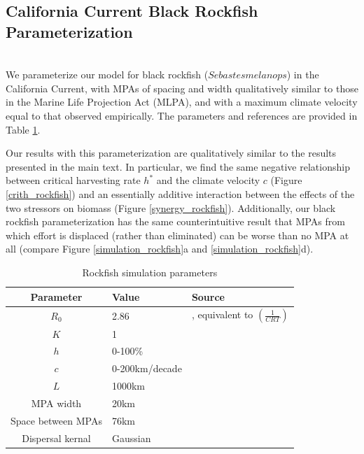 \documentclass[12pt,english]{article}
\begin{document}
\subsection{California Current Black Rockfish Parameterization \label{rock}}
~\\We parameterize our model for black rockfish ($Sebastes melanops$) in the California Current, with MPAs of spacing and width qualitatively similar to those in the Marine Life Projection Act (MLPA), and with a maximum climate velocity equal to that observed empirically. The parameters and references are provided in Table \ref{rockfish_params}.

Our results with this parameterization are qualitatively similar to the results presented in the main text. In particular, we find the same negative relationship between critical harvesting rate $h^*$ and the climate velocity $c$ (Figure \ref{crith_rockfish}) and an essentially additive interaction between the effects of the two stressors on biomass (Figure \ref{synergy_rockfish}). Additionally, our black rockfish parameterization has the same counterintuitive result that MPAs from which effort is displaced (rather than eliminated) can be worse than no MPA at all (compare Figure \ref{simulation_rockfish}a and \ref{simulation_rockfish}d). 

\begin{table}[htdp]
\caption{\label{rockfish_params} Rockfish simulation parameters}
\begin{center}
\begin{tabular}{c l l}
\hline
Parameter & Value & Source\\
\hline
$R_0$ & 2.86 & \citet{white2010decision}, equivalent to $\left(\frac{1}{CRT}\right)$ \\
$K$ & 1 & \cite{white2010decision} \\
$h$ & 0-100\% &\\
$c$ & 0-200km/decade & \cite{burrows2011pace}\\
$L$ & 1000km  & \cite{fishbase} \\
MPA width & 20km & \cite{Gainesetal2010}\\
Space between MPAs & 76km & \cite{Gainesetal2010}\\
Dispersal kernal &  Gaussian & \cite{white2010decision}\\
\hline
\end{tabular}
\end{center}
\end{table}
\end{document}
